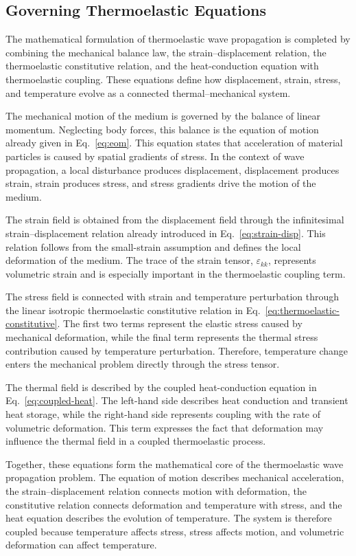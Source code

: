 \subsection{Governing Thermoelastic Equations}

The mathematical formulation of thermoelastic wave propagation is completed by combining the mechanical balance law, the strain--displacement relation, the thermoelastic constitutive relation, and the heat-conduction equation with thermoelastic coupling. These equations define how displacement, strain, stress, and temperature evolve as a connected thermal--mechanical system.

The mechanical motion of the medium is governed by the balance of linear momentum. Neglecting body forces, this balance is the equation of motion already given in Eq.~\eqref{eq:eom}. This equation states that acceleration of material particles is caused by spatial gradients of stress. In the context of wave propagation, a local disturbance produces displacement, displacement produces strain, strain produces stress, and stress gradients drive the motion of the medium.

The strain field is obtained from the displacement field through the infinitesimal strain--displacement relation already introduced in Eq.~\eqref{eq:strain-disp}.
This relation follows from the small-strain assumption and defines the local deformation of the medium. The trace of the strain tensor, \(\varepsilon_{kk}\), represents volumetric strain and is especially important in the thermoelastic coupling term.

The stress field is connected with strain and temperature perturbation through the linear isotropic thermoelastic constitutive relation in Eq.~\eqref{eq:thermoelastic-constitutive}. The first two terms represent the elastic stress caused by mechanical deformation, while the final term represents the thermal stress contribution caused by temperature perturbation. Therefore, temperature change enters the mechanical problem directly through the stress tensor.

The thermal field is described by the coupled heat-conduction equation in Eq.~\eqref{eq:coupled-heat}. The left-hand side describes heat conduction and transient heat storage, while the right-hand side represents coupling with the rate of volumetric deformation. This term expresses the fact that deformation may influence the thermal field in a coupled thermoelastic process.

Together, these equations form the mathematical core of the thermoelastic wave propagation problem. The equation of motion describes mechanical acceleration, the strain--displacement relation connects motion with deformation, the constitutive relation connects deformation and temperature with stress, and the heat equation describes the evolution of temperature. The system is therefore coupled because temperature affects stress, stress affects motion, and volumetric deformation can affect temperature.